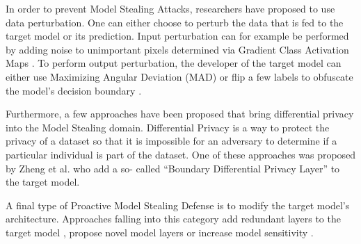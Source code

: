 In order to prevent Model Stealing Attacks, researchers have proposed to use data perturbation. One can either choose to perturb the data that is fed to the target model or its prediction.
Input perturbation can for example be performed by adding noise to unimportant pixels determined via Gradient Class Activation Maps \cite{guiga2020neural}. To perform output perturbation,
the developer of the target model can either use Maximizing Angular Deviation (MAD) \cite{orekondy2019prediction} or flip a few labels to obfuscate the model's decision boundary
\cite{shi2017evasion}. \par
Furthermore, a few approaches have been proposed that bring differential privacy into the Model Stealing domain. Differential Privacy is a way to protect the privacy of a dataset so that 
it is impossible for an adversary to determine if a particular individual is part of the dataset. One of these approaches was proposed by Zheng et al. \cite{zheng2019bdpl} who add a so-
called \enquote{Boundary Differential Privacy Layer} to the target model. \par
A final type of Proactive Model Stealing Defense is to modify the target model's architecture. Approaches falling into this category add redundant layers to the target model 
\cite{chabanne2020protection}, propose novel model layers \cite{xu2018deepobfuscation} or increase model sensitivity \cite{szentannai2020preventing}.
